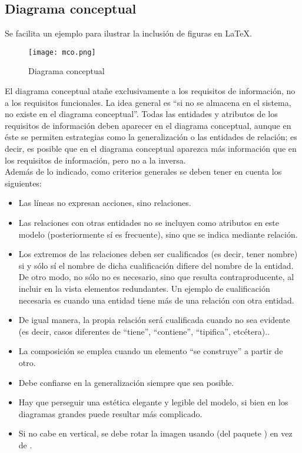 \subsection{\forlnameref Diagrama conceptual}
\label{sec:conceptualModel}

\begin{shaded}
Se facilita un ejemplo para ilustrar la inclusión de figuras en \LaTeX.
\end{shaded}

\begin{figure}[H]
\centering
\texttt{[image: mco.png]}
\caption{Diagrama conceptual}
\label{fig:mco}
\end{figure}

\begin{shaded}
El diagrama conceptual atañe exclusivamente a los requisitos de información, no a los requisitos funcionales. La idea general es ``si no se almacena en el sistema, no existe en el diagrama conceptual''. Todas las entidades y atributos de los requisitos de información deben aparecer en el diagrama conceptual, aunque en éste se permiten estrategias como la generalización o las entidades de relación; es decir, es posible que en el diagrama conceptual aparezca más información que en los requisitos de información, pero no a la inversa.\\

Además de lo indicado, como criterios generales se deben tener en cuenta los siguientes:
\begin{itemize}
    \item Las líneas no expresan acciones, sino relaciones.
    \item Las relaciones con otras entidades no se incluyen como atributos en este modelo (posteriormente sí es frecuente), sino que se indica mediante relación.
    \item Los extremos de las relaciones deben ser cualificados (es decir, tener nombre) si y sólo sí el nombre de dicha cualificación difiere del nombre de la entidad. De otro modo, no sólo no es necesario, sino que resulta contraproducente, al incluir en la vista elementos redundantes. Un ejemplo de cualificación necesaria es cuando una entidad tiene más de una relación con otra entidad.
    \item De igual manera, la propia relación será cualificada cuando no sea evidente (es decir, casos diferentes de ``tiene'', ``contiene'', ``tipifica'', etcétera)..
    \item La composición se emplea cuando un elemento ``se construye'' a partir de otro.
    \item Debe confiarse en la generalización siempre que sea posible.
    \item Hay que perseguir una estética elegante y legible del modelo, si bien en los diagramas grandes puede resultar más complicado.
    \item Si no cabe en vertical, se debe rotar la imagen usando  (del paquete ) en vez de .
\end{itemize}

\end{shaded}